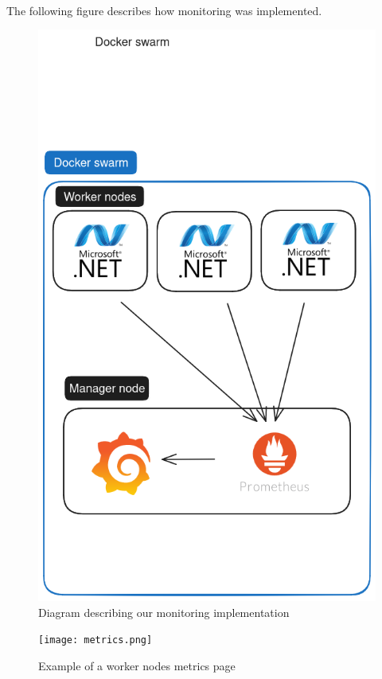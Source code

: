 \paragraph{} The following figure describes how monitoring was implemented.
\begin{figure}[H]
	\centering
	\includegraphics[width=1\textwidth]{Monitoring2.png}
	\caption{Diagram describing our monitoring implementation}
	\label{fig:Monitoring2}
\end{figure}
\begin{figure}[H]
	\centering
	\texttt{[image: metrics.png]}
	\caption{Example of a worker nodes metrics page}
	\label{fig:metrics}
\end{figure}

